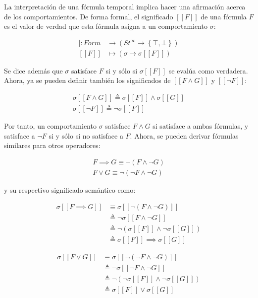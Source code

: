 La interpretación de una fórmula temporal implica hacer una afirmación acerca de los comportamientos. De forma formal, el significado $[[F]]$ de una fórmula $F$ es el valor de verdad que esta fórmula asigna a un comportamiento $\sigma$:

\begin{align*}
[[\cdot]] : Form &\to (St^\infty \to \left\lbrace \top, \bot \right\rbrace) \\
[[F]] &\mapsto (\sigma \mapsto \sigma[[F]])
\end{align*}

Se dice además que $\sigma$ satisface $F$ si y sólo si $\sigma[[F]]$ se evalúa como verdadera. Ahora, ya se pueden definir también los significados de $[[F \land G]]$ y $[[\neg F]]$:

\begin{gather*}
\sigma [[F \land G]] \triangleq \sigma[[F]] \land \sigma[[G]] \\
\sigma [[\neg F]] \triangleq \neg \sigma[[F]]
\end{gather*}

Por tanto, un comportamiento $\sigma$ satisface $F \land G$ si satisface a ambas fórmulas, y satisface a $\neg F$ si y sólo si no satisface a $F$. Ahora, se pueden derivar fórmulas similares para otros operadores:

\begin{gather*}
F \implies G \equiv \neg (F \land \neg G) \\
F \lor G \equiv \neg (\neg F \land \neg G)
\end{gather*}

\noindent
y su respectivo significado semántico como:

\begin{align*}
\sigma[[F \implies G]] &\equiv \sigma[[\neg (F \land \neg G)]] \\
&\triangleq \neg\sigma [[F \land \neg G]] \\
&\triangleq \neg(\sigma[[F]] \land \neg\sigma[[G]]) \\
&\triangleq \sigma[[F]] \implies \sigma[[G]]
\end{align*}

\begin{align*}
\sigma[[F \lor G]] &\equiv \sigma[[\neg (\neg F \land \neg G)]] \\
&\triangleq \neg \sigma[[\neg F \land \neg G]] \\
&\triangleq \neg (\neg\sigma[[F]] \land \neg\sigma[[G]]) \\
&\triangleq \sigma[[F]] \lor \sigma[[G]]
\end{align*}

